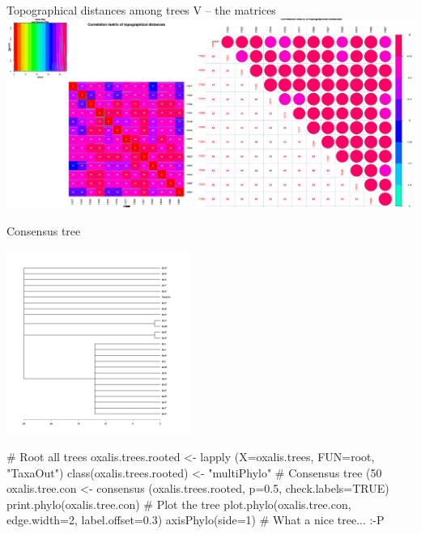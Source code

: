 \documentclass[compress, ucs, xelatex, 11pt, xcolor=svgnames,
  hyperref={
    bookmarks=true,
    unicode=true,
    colorlinks=true,
    pdftitle={Molecular data in R},
    plainpages=false,
    pdfauthor={Vojtech Zeisek},
    pdfsubject={Course about phylogeny and evolution in R},
    pdfcreator={XeLaTeX},
    pdfkeywords={R, evolution, phylogeny, molecular data},
    linkcolor=Tomato,
    anchorcolor=SaddleBrown,
    citecolor=Goldenrod,
    filecolor=DarkMagenta,
    menucolor=Sienna,
    urlcolor=DarkTurquoise,
    pdftex},
  url={hyphens, lowtilde} %
  ]{beamer}
\begin{document}
\begin{frame}{Topographical distances among trees V -- the matrices}
\includegraphics[width=\textwidth]{oxalis-dist.png}
\end{frame}

\begin{frame}[fragile]{Consensus tree}
\begin{multicols}{2}
  \includegraphics[height=6cm]{oxalis-cons.png}
  \begin{spluscode}
    # Root all trees
    oxalis.trees.rooted <- lapply
      (X=oxalis.trees, FUN=root,
      "TaxaOut")
    class(oxalis.trees.rooted) <-
      "multiPhylo"
    # Consensus tree (50 %
    oxalis.tree.con <- consensus
      (oxalis.trees.rooted, p=0.5,
      check.labels=TRUE)
    print.phylo(oxalis.tree.con)
    # Plot the tree
    plot.phylo(oxalis.tree.con,
      edge.width=2, label.offset=0.3)
    axisPhylo(side=1)
    # What a nice tree... :-P
  \end{spluscode}
\end{multicols}
\end{frame}
\end{document}
